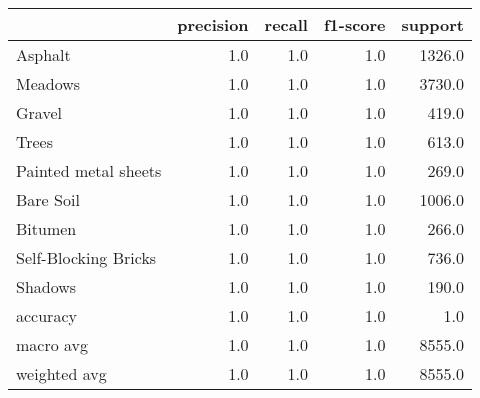 \begin{tabular}{lrrrr}
\toprule
{} &  precision &  recall &  f1-score &  support \\
\midrule
Asphalt              &        1.0 &     1.0 &       1.0 &   1326.0 \\
Meadows              &        1.0 &     1.0 &       1.0 &   3730.0 \\
Gravel               &        1.0 &     1.0 &       1.0 &    419.0 \\
Trees                &        1.0 &     1.0 &       1.0 &    613.0 \\
Painted metal sheets &        1.0 &     1.0 &       1.0 &    269.0 \\
Bare Soil            &        1.0 &     1.0 &       1.0 &   1006.0 \\
Bitumen              &        1.0 &     1.0 &       1.0 &    266.0 \\
Self-Blocking Bricks &        1.0 &     1.0 &       1.0 &    736.0 \\
Shadows              &        1.0 &     1.0 &       1.0 &    190.0 \\
accuracy             &        1.0 &     1.0 &       1.0 &      1.0 \\
macro avg            &        1.0 &     1.0 &       1.0 &   8555.0 \\
weighted avg         &        1.0 &     1.0 &       1.0 &   8555.0 \\
\bottomrule
\end{tabular}

